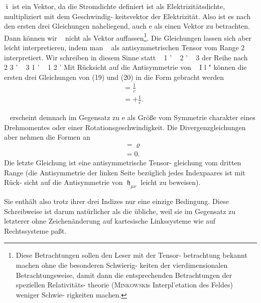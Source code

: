 $\mfraki$ ist ein Vektor, da die Stromdichte definiert ist als
Elektrizitätsdichte, multipliziert mit dem Geschwindig-
keitsvektor der Elektrizität. Also ist es nach den ersten
drei Gleichungen naheliegend, auch e als einen Vektor
zu betrachten. Dann können wir
~
nicht als Vektor
auffassen\footnote{Diese Betrachtungen sollen den Leser mit der Tensor-
betrachtung bekannt machen ohne die besonderen Schwierig-
keiten der vierdimensionalen Betrachtungsweise, damit dann
die entsprechenden Betrachtungen der speziellen Relativitäts-
theorie (\textsc{Minkowski}s Interpl'etation des Feldes) weniger Schwie-
rigkeiten machen.}. Die Gleichungen lassen sich aber leicht
interpretieren, indem man
~
als antisymmetrischen
Tensor vom Range 2 interpretiert. Wir schreiben in
diesem Sinne statt ~ 1 ' ~ 2 ' ~ 3 der Reihe nach ~ 2 3 ' ~ 3 1 ' ~ 1 2 '
Mit Rücksicht auf die Antisymmetrie von ~ I l " können
die ersten drei Gleichungen von (19) und (20) in die
Form gebracht werden
\begin{align}
    &= \frac{1}{c}
    \tag{(19a)} \\
    &= +\frac{1}{c}.
    \tag{(20a)}
\end{align}

~
erscheint demnach im Gegensatz zu e als Größe vom
Symmetrie charakter eines Drehmomentes oder einer
Rotationsgeschwindigkeit. Die Divergenzgleichungen
aber nehmen die Formen an
\begin{align}
    &= \varrho
    \tag{(19b)} \\
    &= 0.
    \tag{(20b)}
\end{align}
Die letzte Gleichung ist eine antisymmetrische Tensor-
gleichung vom dritten Range (die Antisymmetrie der
linken Seite bezüglich jedes Indexpaares ist mit Rück-
sicht auf die Antisymmetrie von $\mfrakh_{\mu\nu}$ leicht zu beweisen).

Sie enthält also trotz ihrer drei Indizes nur eine einzige
Bedingung. Diese Schreibweise ist darum natürlicher
als die übliche, weil sie im Gegensatz zu letzterer ohne
Zeichenänderung auf kartesische Linkssysteme wie auf
Rechtssysteme paßt.